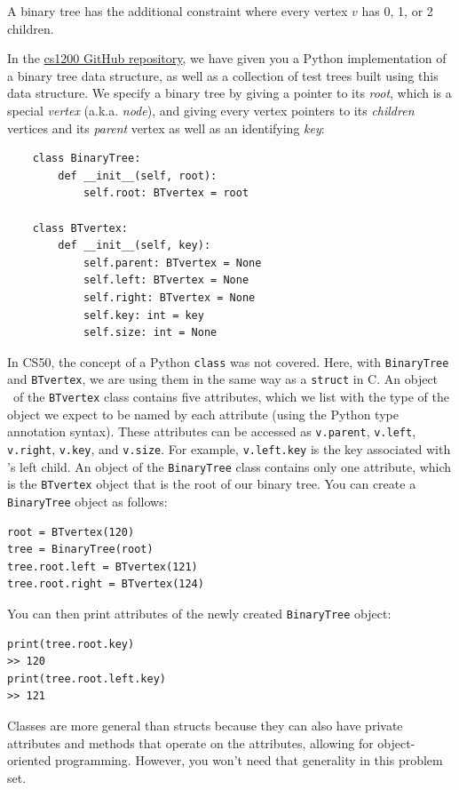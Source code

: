 \documentclass[11pt]{article}
\begin{document}
\begin{enumerate}
 A binary tree has the additional constraint where every vertex $v$ has 0, 1, or 2 children.
\fi

 In the \href{https://github.com/Harvard-CS-1200/2025-Fall}{cs1200 GitHub repository}, we have given you a Python implementation of a binary tree data structure, as well as a collection of test trees built using this data structure.  We specify a binary tree by giving a pointer to its {\em root}, which is a special {\em vertex} (a.k.a. {\em node}), and giving every vertex pointers to its {\em children} vertices and its {\em parent} vertex as well as an identifying {\em key}: 
 
 \begin{verbatim}
    class BinaryTree:
        def __init__(self, root):
            self.root: BTvertex = root
 
    class BTvertex:
        def __init__(self, key):
            self.parent: BTvertex = None
            self.left: BTvertex = None
            self.right: BTvertex = None
            self.key: int = key
            self.size: int = None
 \end{verbatim}


 In CS50, the concept of a Python \texttt{class} was not covered. Here, with \texttt{BinaryTree} and \texttt{BTvertex}, we are using them in the same way as a \texttt{struct} in C. An object \btv\ of the \texttt{BTvertex} class contains five attributes, which we list with the type of the object we expect to be named by each attribute (using the Python type annotation syntax). These attributes can be accessed as \texttt{v.parent}, \texttt{v.left}, \texttt{v.right}, \texttt{v.key}, and \texttt{v.size}. 
 For example, \texttt{v.left.key} is the key associated with \btv's left child. An object of the \texttt{BinaryTree} class contains only one attribute, which is the \texttt{BTvertex} object that is the root of our binary tree. You can create a \texttt{BinaryTree} object as follows:
 
\begin{verbatim}
root = BTvertex(120)
tree = BinaryTree(root)
tree.root.left = BTvertex(121)
tree.root.right = BTvertex(124)
\end{verbatim}

You can then print attributes of the newly created \texttt{BinaryTree} object:
\begin{verbatim}
print(tree.root.key)
>> 120
print(tree.root.left.key)
>> 121
\end{verbatim}
 

 Classes are more general than structs because they can also have private attributes and methods that operate on the attributes, allowing for object-oriented programming. However, you won't need that generality in this problem set.


\end{enumerate}
\end{document}
